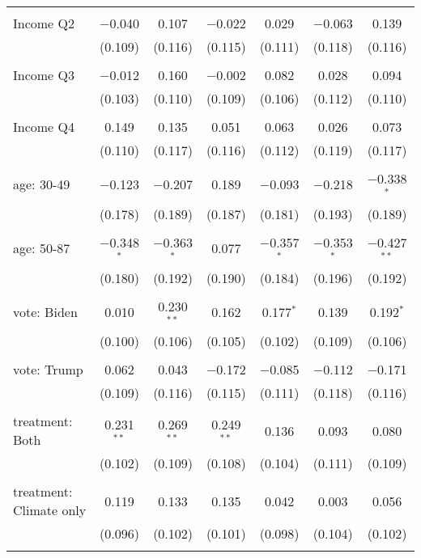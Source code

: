\begin{tabular}{@{\extracolsep{5pt}}lcccccc}
  & & & & & & \\ 
 Income Q2 & $-$0.040 & 0.107 & $-$0.022 & 0.029 & $-$0.063 & 0.139 \\ 
  & (0.109) & (0.116) & (0.115) & (0.111) & (0.118) & (0.116) \\ 
  & & & & & & \\ 
 Income Q3 & $-$0.012 & 0.160 & $-$0.002 & 0.082 & 0.028 & 0.094 \\ 
  & (0.103) & (0.110) & (0.109) & (0.106) & (0.112) & (0.110) \\ 
  & & & & & & \\ 
 Income Q4 & 0.149 & 0.135 & 0.051 & 0.063 & 0.026 & 0.073 \\ 
  & (0.110) & (0.117) & (0.116) & (0.112) & (0.119) & (0.117) \\ 
  & & & & & & \\ 
 age: 30-49 & $-$0.123 & $-$0.207 & 0.189 & $-$0.093 & $-$0.218 & $-$0.338$^{*}$ \\ 
  & (0.178) & (0.189) & (0.187) & (0.181) & (0.193) & (0.189) \\ 
  & & & & & & \\ 
 age: 50-87 & $-$0.348$^{*}$ & $-$0.363$^{*}$ & 0.077 & $-$0.357$^{*}$ & $-$0.353$^{*}$ & $-$0.427$^{**}$ \\ 
  & (0.180) & (0.192) & (0.190) & (0.184) & (0.196) & (0.192) \\ 
  & & & & & & \\ 
 vote: Biden & 0.010 & 0.230$^{**}$ & 0.162 & 0.177$^{*}$ & 0.139 & 0.192$^{*}$ \\ 
  & (0.100) & (0.106) & (0.105) & (0.102) & (0.109) & (0.106) \\ 
  & & & & & & \\ 
 vote: Trump & 0.062 & 0.043 & $-$0.172 & $-$0.085 & $-$0.112 & $-$0.171 \\ 
  & (0.109) & (0.116) & (0.115) & (0.111) & (0.118) & (0.116) \\ 
  & & & & & & \\ 
 treatment: Both & 0.231$^{**}$ & 0.269$^{**}$ & 0.249$^{**}$ & 0.136 & 0.093 & 0.080 \\ 
  & (0.102) & (0.109) & (0.108) & (0.104) & (0.111) & (0.109) \\ 
  & & & & & & \\ 
 treatment: Climate only & 0.119 & 0.133 & 0.135 & 0.042 & 0.003 & 0.056 \\ 
  & (0.096) & (0.102) & (0.101) & (0.098) & (0.104) & (0.102) \\ 
  & & & & & & \\ 

\end{tabular}
